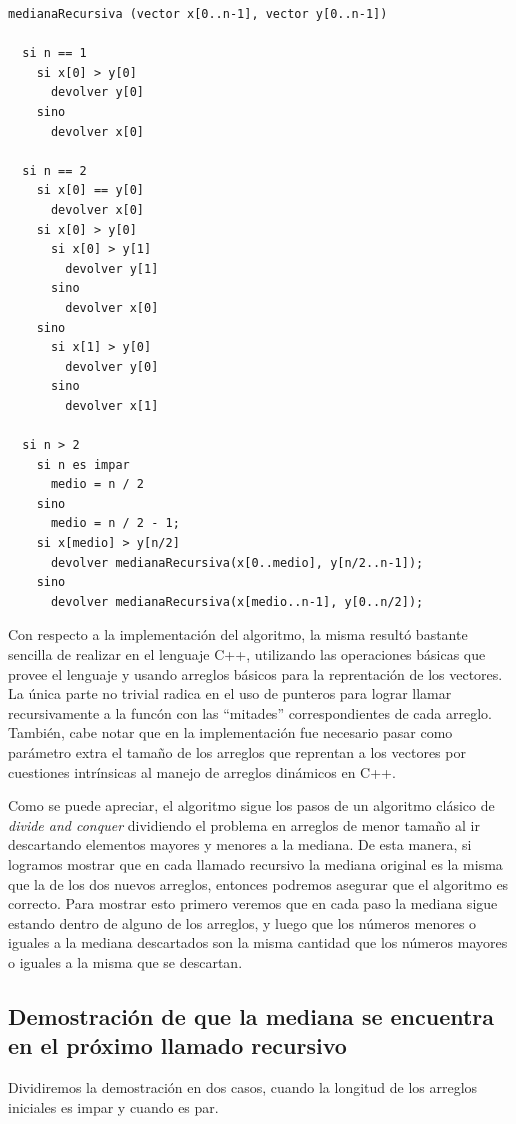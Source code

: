 \documentclass[a4paper,10pt] {article}
\begin{document}
\begin{verbatim}
medianaRecursiva (vector x[0..n-1], vector y[0..n-1])

  si n == 1
    si x[0] > y[0]
      devolver y[0]
    sino
      devolver x[0]

  si n == 2
    si x[0] == y[0]
      devolver x[0]
    si x[0] > y[0]
      si x[0] > y[1]
        devolver y[1]
      sino
        devolver x[0]
    sino
      si x[1] > y[0]
        devolver y[0]
      sino
        devolver x[1]

  si n > 2
    si n es impar
      medio = n / 2
    sino
      medio = n / 2 - 1;
    si x[medio] > y[n/2]
      devolver medianaRecursiva(x[0..medio], y[n/2..n-1]);
    sino
      devolver medianaRecursiva(x[medio..n-1], y[0..n/2]);
\end{verbatim}

Con respecto a la implementaci\'on del algoritmo, la misma result\'o bastante sencilla de realizar en el lenguaje C++, utilizando las operaciones b\'asicas que provee el lenguaje y usando arreglos b\'asicos para la reprentaci\'on de los vectores. La \'unica parte no trivial radica en el uso de punteros para lograr llamar recursivamente a la func\'on con las ``mitades'' correspondientes de cada arreglo. Tambi\'en, cabe notar que en la implementaci\'on fue necesario pasar como par\'ametro extra el tama\~{n}o de los arreglos que reprentan a los vectores por cuestiones intr\'insicas al manejo de arreglos din\'amicos en C++.

Como se puede apreciar, el algoritmo sigue los pasos de un algoritmo cl\'asico de \textit{divide and conquer} dividiendo el problema en arreglos de menor tama\~{n}o al ir descartando elementos mayores y menores a la mediana. De esta manera, si logramos mostrar que en cada llamado recursivo la mediana original es la misma que la de los dos nuevos arreglos, entonces podremos asegurar que el algoritmo es correcto. Para mostrar esto primero veremos que en cada paso la mediana sigue estando dentro de alguno de los arreglos, y luego que los n\'umeros menores o iguales a la mediana descartados son la misma cantidad que los n\'umeros mayores o iguales a la misma que se descartan.

\subsection*{Demostraci\'on de que la mediana se encuentra en el pr\'oximo llamado recursivo}

Dividiremos la demostraci\'on en dos casos, cuando la longitud de los arreglos iniciales es impar y cuando es par.
\end{document}
